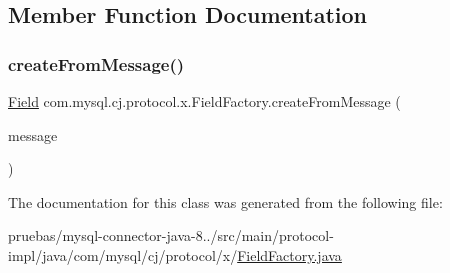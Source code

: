 \subsection{Member Function Documentation}
\mbox{\label{classcom_1_1mysql_1_1cj_1_1protocol_1_1x_1_1_field_factory_a931d4f5d7b65057a295f9e2ba8233986}} 
\subsubsection{\texorpdfstring{create\+From\+Message()}{createFromMessage()}}
{\footnotesize\ttfamily \mbox{\hyperlink{classcom_1_1mysql_1_1cj_1_1result_1_1_field}{Field}} com.\+mysql.\+cj.\+protocol.\+x.\+Field\+Factory.\+create\+From\+Message (\begin{DoxyParamCaption}\item[{\mbox{\hyperlink{classcom_1_1mysql_1_1cj_1_1protocol_1_1x_1_1_x_message}{X\+Message}}}]{message }\end{DoxyParamCaption})}



The documentation for this class was generated from the following file\+:\begin{DoxyCompactItemize}
\item 
pruebas/mysql-\/connector-\/java-\/8../src/main/protocol-\/impl/java/com/mysql/cj/protocol/x/\mbox{\hyperlink{_field_factory_8java}{Field\+Factory.\+java}}\end{DoxyCompactItemize}
